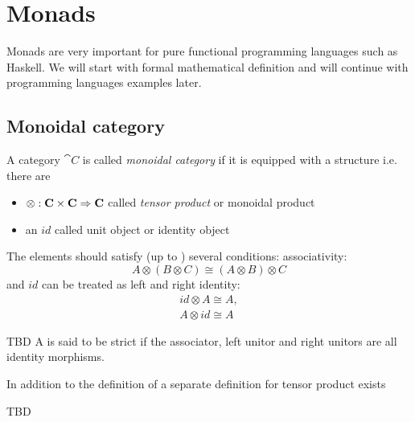 \chapter{Monads}

Monads are very important for pure functional programming languages
such as Haskell. We will start with formal mathematical definition and
will continue with programming languages examples later.


\section{Monoidal category}

\begin{definition}
\label{def:monoidal_category}
A category $\cat{C}$ is called \textit{monoidal category} if it is
equipped with a  structure i.e. there are
\begin{itemize}
\item {} $\otimes: \mathbf{C} \times \mathbf{C} \Rightarrow
  \mathbf{C}$ called \textit{tensor product} or monoidal product
\item an  $id$ called unit object or identity object
\end{itemize}

The elements should satisfy (up to ) several conditions:
associativity: 
\begin{equation}
A \otimes \left( B \otimes C \right) \cong
  \left( A \otimes B \right) \otimes C
\nonumber
\end{equation}
and $id$ can be treated as left and right identity: 
\begin{eqnarray}
id \otimes A \cong A, 
\nonumber \\
A \otimes id \cong A
\nonumber
\end{eqnarray}
\end{definition}

\begin{definition}
\label{def:strict_monoidal_category}
TBD
A  is said to be strict if the
associator, left 
unitor and right unitors are all identity morphisms. 
\end{definition}

In addition to the definition of  a
separate definition for tensor product exists
\begin{definition}
  \label{def:tensor_product}
  TBD
\end{definition}


